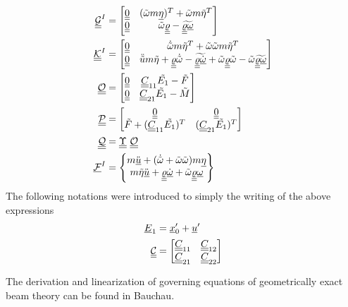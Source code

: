 \begin{align}
        \label{mathcalG}
        \underline{\underline{\mathcal{G}}}^I &= \begin{bmatrix}
        \underline{\underline{0}} & (\tilde{\omega} m \underline{\eta})^T+\tilde{\omega} m \tilde{\eta}^T  \\
        \underline{\underline{0}} & \tilde{\omega} \underline{\underline{\varrho}}-\widetilde{\underline{\underline{\varrho}} \underline{\omega}}
        \end{bmatrix} \\
        \label{mathcalK}
        \underline{\underline{\mathcal{K}}}^I &= \begin{bmatrix}
        \underline{\underline{0}} & \dot{\tilde{\omega}}m\tilde{\eta}^T + \tilde{\omega} \tilde{\omega}m\tilde{\eta}^T  \\
        \underline{\underline{0}} & \ddot{\tilde{u}}m\tilde{\eta} + \underline{\underline{\varrho}} \dot{\tilde{\omega}}-\widetilde{\underline{\underline{\varrho}} \underline{\dot{\omega}}}+\tilde{\omega} \underline{\underline{\varrho}} \tilde{\omega} - \tilde{\omega}  \widetilde{\underline{\underline{\varrho}} \underline{\omega}}
        \end{bmatrix}\\
	\label{mathcalO}
	\mathcal{\underline{\underline{O}}} &= \begin{bmatrix}
	\underline{\underline{0}} & \underline{\underline{C}}_{11} \tilde{E_1} - \tilde{F} \\
	\underline{\underline{0}}& \underline{\underline{C}}_{21} \tilde{E_1} - \tilde{M}
	\end{bmatrix} \\
	\label{mathcalP}
	\mathcal{\underline{\underline{P}}} &= \begin{bmatrix}
	\underline{\underline{0}} & \underline{\underline{0}} \\
	\tilde{F} +  (\underline{\underline{C}}_{11} \tilde{E_1})^T & (\underline{\underline{C}}_{21} \tilde{E_1})^T
	\end{bmatrix}  \\
	\label{mathcalQ}
	\mathcal{\underline{\underline{Q}}} &= \underline{\underline{\Upsilon}}~ \mathcal{\underline{\underline{O}}} \\
	\label{mathcalF}
	\underline{\mathcal{F}}^I &= \begin{Bmatrix}
	m \ddot{\underline{u}} + (\dot{\tilde{\omega}} + \tilde{\omega} \tilde{\omega})m \underline{\eta} \\
	m \tilde{\eta} \ddot{\underline{u}} +\underline{\underline{\varrho}}\dot{\underline{\omega}}+\tilde{\omega}\underline{\underline{\varrho}}\underline{\omega}
	\end{Bmatrix}
\end{align}
The following notations were introduced to simply the writing of the above expressions
\begin{align}
    \label{E1}
    \underline{E}_1 &= \underline{x}_0^\prime + \underline{u}^\prime \\
    \label{PartC}
    \underline{\underline{\mathcal{C}}} &= \begin{bmatrix}
    \underline{\underline{C}}_{11} & \underline{\underline{C}}_{12} \\
    \underline{\underline{C}}_{21} & \underline{\underline{C}}_{22}
    \end{bmatrix}
\end{align}
 
The derivation and linearization of governing equations of geometrically
exact beam theory can be found in Bauchau\cite{Bauchau:2010}.

